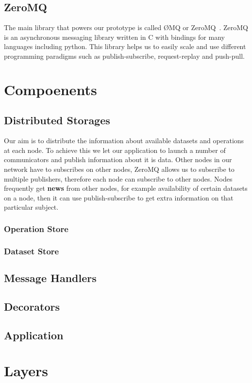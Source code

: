 \subsection{ZeroMQ}
The main library that powers our prototype is called ØMQ or ZeroMQ~\cite{ZeroMQ}.
ZeroMQ is an asynchronous messaging library written in C with 
bindings for many languages including python. This library helps us to easily scale and use 
different programming paradigms such as publish-subscribe, request-replay and push-pull.

\section{Compoenents}
\subsection{Distributed Storages}
Our aim is to distribute the information about available datasets and operations at each node. To achieve this
we let our application to launch a number of communicators and publish information about it is data.
Other nodes in our network have to subscribes on other nodes, ZeroMQ allows us to subscribe
to multiple publishers, therefore each node can subscribe to other nodes. Nodes frequently get
\textbf{news} from other nodes, for example availability of certain datasets on a node, then it
can use publish-subscribe to get extra information on that particular subject.
\subsubsection{Operation Store}
\subsubsection{Dataset Store}
\subsection{Message Handlers}
\subsection{Decorators}
\subsection{Application}

\section{Layers}
